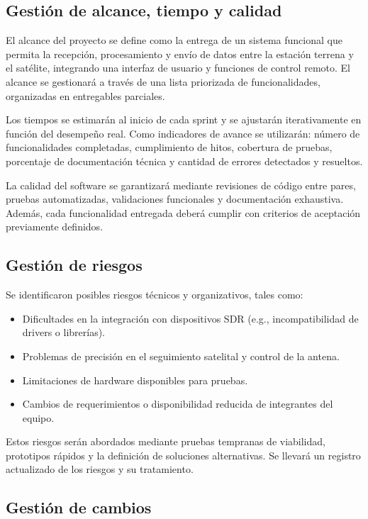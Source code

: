 \subsection*{Gestión de alcance, tiempo y calidad}

El alcance del proyecto se define como la entrega de un sistema funcional que permita la recepción, procesamiento y envío de datos entre la estación terrena y el satélite, integrando una interfaz de usuario y funciones de control remoto. El alcance se gestionará a través de una lista priorizada de funcionalidades, organizadas en entregables parciales.

Los tiempos se estimarán al inicio de cada sprint y se ajustarán iterativamente en función del desempeño real. Como indicadores de avance se utilizarán: número de funcionalidades completadas, cumplimiento de hitos, cobertura de pruebas, porcentaje de documentación técnica y cantidad de errores detectados y resueltos.

La calidad del software se garantizará mediante revisiones de código entre pares, pruebas automatizadas, validaciones funcionales y documentación exhaustiva. Además, cada funcionalidad entregada deberá cumplir con criterios de aceptación previamente definidos.

\subsection*{Gestión de riesgos}

Se identificaron posibles riesgos técnicos y organizativos, tales como:

\begin{itemize}
    \item Dificultades en la integración con dispositivos SDR (e.g., incompatibilidad de drivers o librerías).
    \item Problemas de precisión en el seguimiento satelital y control de la antena.
    \item Limitaciones de hardware disponibles para pruebas.
    \item Cambios de requerimientos o disponibilidad reducida de integrantes del equipo.
\end{itemize}

Estos riesgos serán abordados mediante pruebas tempranas de viabilidad, prototipos rápidos y la definición de soluciones alternativas. Se llevará un registro actualizado de los riesgos y su tratamiento.

\subsection*{Gestión de cambios}

